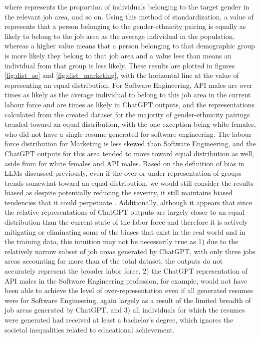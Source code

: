 \documentclass{article}
\begin{document}
    where  represents the proportion of individuals belonging to the target gender in the relevant job area, and so on. Using this method of standardization, a value of  represents that a person belonging to the gender-ethnicity pairing is equally as likely to belong to the job area as the average individual in the population, whereas a higher value means that a person belonging to that demographic group is more likely they belong to that job area and a value less than  means an individual from that group is less likely. These results are plotted in figures \ref{fig:dist_se} and \ref{fig:dist_marketing}, with the horizontal line at the value of  representing an equal distribution. For Software Engineering, API males are over  times as likely as the average individual to belong to this job area in the current labour force and are  times as likely in ChatGPT outputs, and the representations calculated from the created dataset for the majority of gender-ethnicity pairings trended toward an equal distribution, with the one exception being white females, who did not have a single resume generated for software engineering. The labour force distribution for Marketing is less skewed than Software Engineering, and the ChatGPT outputs for this area tended to move toward equal distribution as well, aside from for white females and API males. Based on the definition of bias in LLMs discussed previously, even if the over-or-under-representation of groups trends somewhat toward an equal distribution, we would still consider the results biased as despite potentially reducing the severity, it still maintains biased tendencies that it could perpetuate \cite{borji2023categorical}. Additionally, although it appears that since the relative representations of ChatGPT outputs are largely closer to an equal distribution than the current state of the labor force and therefore it is actively mitigating or eliminating some of the biases that exist in the real world and in the training data, this intuition may not be necessarily true as 1) due to the relatively narrow subset of job areas generated by ChatGPT, with only three jobs areas accounting for more than  of the total dataset, the outputs do not accurately represent the broader labor force, 2) the ChatGPT representation of API males in the Software Engineering profession, for example, would not have been able to achieve the level of over-representation even if all  generated resumes were for Software Engineering, again largely as a result of the limited breadth of job areas generated by ChatGPT, and 3) all individuals for which the  resumes were generated had received at least a bachelor's degree, which ignores the societal inequalities related to educational achievement.
\end{document}
